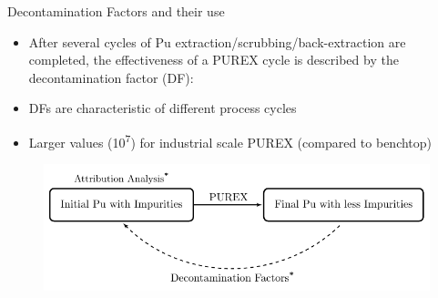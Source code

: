 \documentclass{beamer}
\newcommand{\tss}{\textsuperscript}
\begin{document}
\begin{frame}{Decontamination Factors and their use}
  \begin{itemize}
  \item{After several cycles of Pu extraction/scrubbing/back-extraction
    are completed, the effectiveness of a PUREX cycle is described
    by the decontamination factor (DF):}
  \item{DFs are characteristic of different process cycles}
  \item{Larger values (10\tss{7}) for industrial scale PUREX (compared
  to benchtop)\tss{\cite{stoller1961reactor,benedict1982nuclear}}}
  \end{itemize}
  \begin{figure}[H]
    \vspace{-3mm}
      \begin{center}
        \includegraphics[scale = 0.7]{figures/purpose}
      \end{center}
    \end{figure}
\end{frame}

\end{document}
